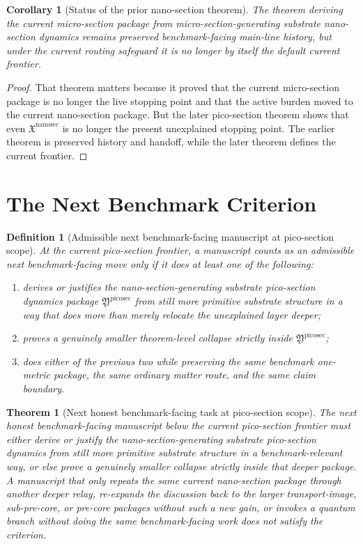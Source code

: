 \documentclass[11pt]{article}
\newcommand{\NanoSectionPackage}{\mathfrak X^{\mathrm{nanosec}}}
\newcommand{\PicoSectionPackage}{\mathfrak Y^{\mathrm{picosec}}}
\newtheorem{definition}{Definition}
\newtheorem{corollary}{Corollary}
\newtheorem{theorem}{Theorem}
\begin{document}
\begin{corollary}[Status of the prior nano-section theorem]
The theorem deriving the current micro-section package from micro-section-generating substrate nano-section dynamics remains preserved benchmark-facing main-line history, but under the current routing safeguard it is no longer by itself the default current frontier.
\end{corollary}

\begin{proof}
That theorem matters because it proved that the current micro-section package is no longer the live stopping point and that the active burden moved to the current nano-section package. But the later pico-section theorem shows that even \(\NanoSectionPackage\) is no longer the present unexplained stopping point. The earlier theorem is preserved history and handoff, while the later theorem defines the current frontier.
\end{proof}

\section{The Next Benchmark Criterion}

\begin{definition}[Admissible next benchmark-facing manuscript at pico-section scope]
At the current pico-section frontier, a manuscript counts as an admissible next benchmark-facing move only if it does at least one of the following:
\begin{enumerate}
    \item derives or justifies the nano-section-generating substrate pico-section dynamics package \(\PicoSectionPackage\) from still more primitive substrate structure in a way that does more than merely relocate the unexplained layer deeper;
    \item proves a genuinely smaller theorem-level collapse strictly inside \(\PicoSectionPackage\);
    \item does either of the previous two while preserving the same benchmark one-metric package, the same ordinary matter route, and the same claim boundary.
\end{enumerate}
\end{definition}

\begin{theorem}[Next honest benchmark-facing task at pico-section scope]
The next honest benchmark-facing manuscript below the current pico-section frontier must either derive or justify the nano-section-generating substrate pico-section dynamics from still more primitive substrate structure in a benchmark-relevant way, or else prove a genuinely smaller collapse strictly inside that deeper package. A manuscript that only repeats the same current nano-section package through another deeper relay, re-expands the discussion back to the larger transport-image, sub-pre-core, or pre-core packages without such a new gain, or invokes a quantum branch without doing the same benchmark-facing work does not satisfy the criterion.
\end{theorem}
\end{document}
